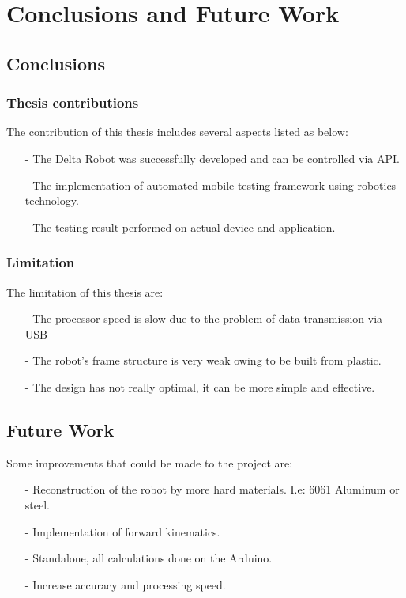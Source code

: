 \chapter{Conclusions and Future Work}

\section{Conclusions}
	\subsection{Thesis contributions}
	The contribution of this thesis includes several aspects listed as below:
	\begin{itemize}
		\item[-] The Delta Robot was successfully developed and can be controlled via API.
		\item[-] The implementation of automated mobile testing framework using robotics technology.
		\item[-] The testing result performed on actual device and application.
	\end{itemize}
	\subsection{Limitation}
	The limitation of this thesis are:
	\begin{itemize}
		\item[-] The processor speed is slow due to the problem of data transmission via USB
		\item[-] The robot's frame structure is very weak owing to be built from plastic.
		\item[-] The design has not really optimal, it can be more simple and effective.
	\end{itemize}

\section{Future Work}
	
	Some improvements that could be made to the project are:
	\begin{itemize}
		\item[-] Reconstruction of the robot by more hard materials. I.e: 6061 Aluminum or steel.
		\item[-] Implementation of forward kinematics.
		\item[-] Standalone, all calculations done on the Arduino.
		\item[-] Increase accuracy and processing speed.
	\end{itemize}
